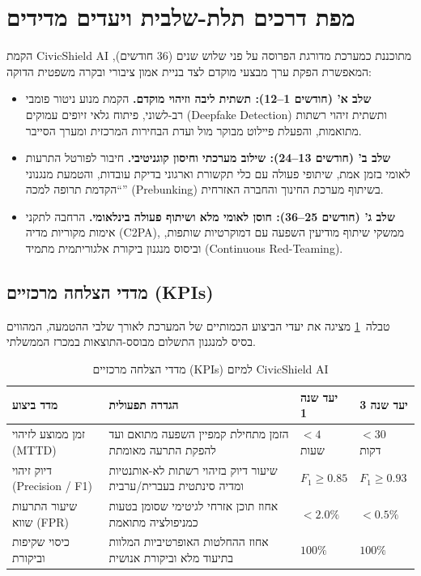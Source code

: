 \section{מפת דרכים תלת-שלבית ויעדים מדידים}
\label{sec:roadmap}

הקמת \textenglish{CivicShield AI} מתוכננת כמערכת מדורגת הפרוסה על פני שלוש שנים (36 חודשים), המאפשרת הפקת ערך מבצעי מוקדם לצד בניית אמון ציבורי ובקרה משפטית הדוקה:

\begin{itemize}
    \item \textbf{שלב א' (חודשים 1--12): תשתית ליבה וזיהוי מוקדם.} הקמת מנוע ניטור פומבי רב-לשוני, פיתוח גלאי זיופים עמוקים (\textenglish{Deepfake Detection}) ותשתית זיהוי רשתות מתואמות, והפעלת פיילוט מבוקר מול ועדת הבחירות המרכזית ומערך הסייבר.
    \item \textbf{שלב ב' (חודשים 13--24): שילוב מערכתי וחיסון קוגניטיבי.} חיבור לפורטל התרעות לאומי בזמן אמת, שיתופי פעולה עם כלי תקשורת וארגוני בדיקת עובדות, והטמעת מנגנוני ``הקדמת תרופה למכה'' (\textenglish{Prebunking}) בשיתוף מערכת החינוך והחברה האזרחית.
    \item \textbf{שלב ג' (חודשים 25--36): חוסן לאומי מלא ושיתוף פעולה בינלאומי.} הרחבה לתקני אימות מקוריות מדיה (\textenglish{C2PA}), ממשקי שיתוף מודיעין השפעה עם דמוקרטיות שותפות, וביסוס מנגנון ביקורת אלגוריתמית מתמיד (\textenglish{Continuous Red-Teaming}).
\end{itemize}

\subsection{מדדי הצלחה מרכזיים (\textenglish{KPIs})}

טבלה~\ref{tab:strategic_kpis} מציגה את יעדי הביצוע הכמותיים של המערכת לאורך שלבי ההטמעה, המהווים בסיס למנגנון התשלום מבוסס-התוצאות במכרז הממשלתי.

\begin{table}[htbp]
\centering
\caption{מדדי הצלחה מרכזיים (\textenglish{KPIs}) למיזם \textenglish{CivicShield AI}}
\label{tab:strategic_kpis}
\begin{tabularx}{\textwidth}{p{3.8cm} X p{2.2cm} p{2.2cm}}
\toprule
\textbf{מדד ביצוע} & \textbf{הגדרה תפעולית} & \textbf{יעד שנה 1} & \textbf{יעד שנה 3} \\
\midrule
זמן ממוצע לזיהוי (\textenglish{MTTD}) & הזמן מתחילת קמפיין השפעה מתואם ועד להפקת התרעה מאומתת & $< 4$ שעות & $< 30$ דקות \\
\addlinespace
דיוק זיהוי (\textenglish{Precision / F1}) & שיעור דיוק בזיהוי רשתות לא-אותנטיות ומדיה סינתטית בעברית/ערבית & $F_1 \ge 0.85$ & $F_1 \ge 0.93$ \\
\addlinespace
שיעור התרעות שווא (\textenglish{FPR}) & אחוז תוכן אזרחי לגיטימי שסומן בטעות כמניפולציה מתואמת & $< 2.0\%$ & $< 0.5\%$ \\
\addlinespace
כיסוי שקיפות וביקורת & אחוז ההחלטות האופרטיביות המלוות בתיעוד מלא וביקורת אנושית & $100\%$ & $100\%$ \\
\bottomrule
\end{tabularx}
\end{table}

